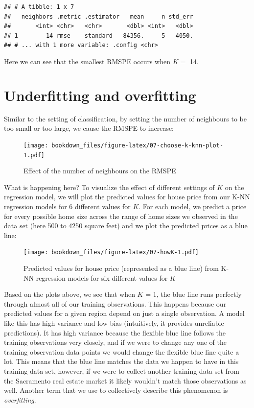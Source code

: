 \documentclass[
]{krantz}
\begin{document}
\begin{verbatim}
## # A tibble: 1 x 7
##   neighbors .metric .estimator   mean     n std_err
##       <int> <chr>   <chr>       <dbl> <int>   <dbl>
## 1        14 rmse    standard   84356.     5   4050.
## # ... with 1 more variable: .config <chr>
\end{verbatim}

Here we can see that the smallest RMSPE occurs when \(K =\) 14.

\hypertarget{underfitting-and-overfitting}{%
\section{Underfitting and overfitting}\label{underfitting-and-overfitting}}

Similar to the setting of classification, by setting the number of neighbours
to be too small or too large, we cause the RMSPE to increase:

\begin{figure}
\centering
\texttt{[image: bookdown\_files/figure-latex/07-choose-k-knn-plot-1.pdf]}
\caption{\label{fig:07-choose-k-knn-plot}Effect of the number of neighbours on the RMSPE}
\end{figure}

What is happening here? To visualize the effect of different settings of \(K\) on the
regression model, we will plot the predicted values for house price from
our K-NN regression models for 6 different values for \(K\). For each model, we
predict a price for every possible home size across the range of home sizes we
observed in the data set (here 500 to 4250 square feet) and we plot the
predicted prices as a blue line:

\begin{figure}
\centering
\texttt{[image: bookdown\_files/figure-latex/07-howK-1.pdf]}
\caption{\label{fig:07-howK}Predicted values for house price (represented as a blue line) from K-NN regression models for six different values for \(K\)}
\end{figure}

Based on the plots above, we see that when \(K\) = 1, the blue line runs perfectly
through almost all of our training observations. This happens because our
predicted values for a given region depend on just a single observation. A
model like this has high variance and low bias (intuitively, it provides unreliable
predictions). It has high variance because
the flexible blue line follows the training observations very closely, and if
we were to change any one of the training observation data points we would
change the flexible blue line quite a lot. This means that the blue line
matches the data we happen to have in this training data set, however, if we
were to collect another training data set from the Sacramento real estate
market it likely wouldn't match those observations as well. Another term
that we use to collectively describe this phenomenon is \emph{overfitting}.
\end{document}
